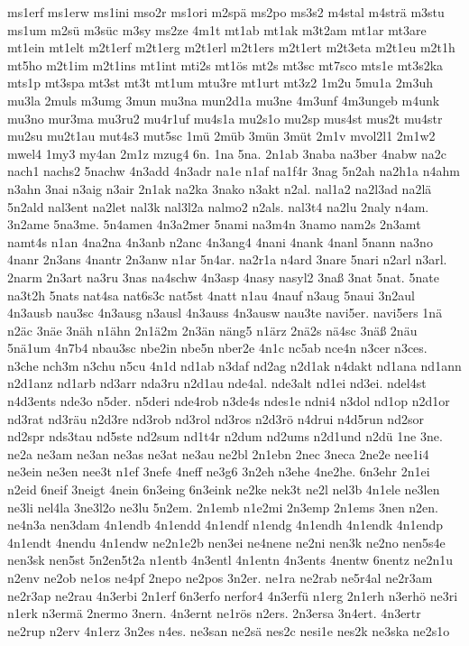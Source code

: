 {ms1erf
ms1erw
ms1ini
mso2r
ms1ori
m2spä
ms2po
ms3s2
m4stal
m4strä
m3stu
ms1um
m2sü
m3süc
m3sy
ms2ze
4m1t
mt1ab
mt1ak
m3t2am
mt1ar
mt3are
mt1ein
mt1elt
m2t1erf
m2t1erg
m2t1erl
m2t1ers
m2t1ert
m2t3eta
m2t1eu
m2t1h
mt5ho
m2t1im
m2t1ins
mt1int
mti2s
mt1ös
mt2s
mt3sc
mt7sco
mts1e
mt3s2ka
mts1p
mt3spa
mt3st
mt3t
mt1um
mtu3re
mt1urt
mt3z2
1m2u
5mu1a
2m3uh
mu3la
2muls
m3umg
3mun
mu3na
mun2d1a
mu3ne
4m3unf
4m3ungeb
m4unk
mu3no
mur3ma
mu3ru2
mu4r1uf
mu4s1a
mu2s1o
mu2sp
mus4st
mus2t
mu4str
mu2su
mu2t1au
mut4s3
mut5sc
1mü
2müb
3mün
3müt
2m1v
mvol2l1
2m1w2
mwel4
1my3
my4an
2m1z
mzug4
6n.
1na
5na.
2n1ab
3naba
na3ber
4nabw
na2c
nach1
nachs2
5nachw
4n3add
4n3adr
na1e
n1af
na1f4r
3nag
5n2ah
na2h1a
n4ahm
n3ahn
3nai
n3aig
n3air
2n1ak
na2ka
3nako
n3akt
n2al.
nal1a2
na2l3ad
na2lä
5n2ald
nal3ent
na2let
nal3k
nal3l2a
nalmo2
n2als.
nal3t4
na2lu
2naly
n4am.
3n2ame
5na3me.
5n4amen
4n3a2mer
5nami
na3m4n
3namo
nam2s
2n3amt
namt4s
n1an
4na2na
4n3anb
n2anc
4n3ang4
4nani
4nank
4nanl
5nann
na3no
4nanr
2n3ans
4nantr
2n3anw
n1ar
5n4ar.
na2r1a
n4ard
3nare
5nari
n2arl
n3arl.
2narm
2n3art
na3ru
3nas
na4schw
4n3asp
4nasy
nasyl2
3naß
3nat
5nat.
5nate
na3t2h
5nats
nat4sa
nat6s3c
nat5st
4natt
n1au
4nauf
n3aug
5naui
3n2aul
4n3ausb
nau3sc
4n3ausg
n3ausl
4n3auss
4n3ausw
nau3te
navi5er.
navi5ers
1nä
n2äc
3näe
3näh
n1ähn
2n1ä2m
2n3än
näng5
n1ärz
2nä2s
nä4sc
3näß
2näu
5nä1um
4n7b4
nbau3sc
nbe2in
nbe5n
nber2e
4n1c
nc5ab
nce4n
n3cer
n3ces.
n3che
nch3m
n3chu
n5cu
4n1d
nd1ab
n3daf
nd2ag
n2d1ak
n4dakt
nd1ana
nd1ann
n2d1anz
nd1arb
nd3arr
nda3ru
n2d1au
nde4al.
nde3alt
nd1ei
nd3ei.
ndel4st
n4d3ents
nde3o
n5der.
n5deri
nde4rob
n3de4s
ndes1e
ndni4
n3dol
nd1op
n2d1or
nd3rat
nd3räu
n2d3re
nd3rob
nd3rol
nd3ros
n2d3rö
n4drui
n4d5run
nd2sor
nd2spr
nds3tau
nd5ste
nd2sum
nd1t4r
n2dum
nd2ums
n2d1und
n2dü
1ne
3ne.
ne2a
ne3am
ne3an
ne3as
ne3at
ne3au
ne2bl
2n1ebn
2nec
3neca
2ne2e
nee1i4
ne3ein
ne3en
nee3t
n1ef
3nefe
4neff
ne3g6
3n2eh
n3ehe
4ne2he.
6n3ehr
2n1ei
n2eid
6neif
3neigt
4nein
6n3eing
6n3eink
ne2ke
nek3t
ne2l
nel3b
4n1ele
ne3len
ne3li
nel4la
3ne3l2o
ne3lu
5n2em.
2n1emb
n1e2mi
2n3emp
2n1ems
3nen
n2en.
ne4n3a
nen3dam
4n1endb
4n1endd
4n1endf
n1endg
4n1endh
4n1endk
4n1endp
4n1endt
4nendu
4n1endw
ne2n1e2b
nen3ei
ne4nene
ne2ni
nen3k
ne2no
nen5s4e
nen3sk
nen5st
5n2en5t2a
n1entb
4n3entl
4n1entn
4n3ents
4nentw
6nentz
ne2n1u
n2env
ne2ob
ne1os
ne4pf
2nepo
ne2pos
3n2er.
ne1ra
ne2rab
ne5r4al
ne2r3am
ne2r3ap
ne2rau
4n3erbi
2n1erf
6n3erfo
nerfor4
4n3erfü
n1erg
2n1erh
n3erhö
ne3ri
n1erk
n3ermä
2nermo
3nern.
4n3ernt
ne1rös
n2ers.
2n3ersa
3n4ert.
4n3ertr
ne2rup
n2erv
4n1erz
3n2es
n4es.
ne3san
ne2sä
nes2c
nesi1e
nes2k
ne3ska
ne2s1o
}
